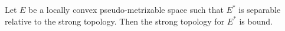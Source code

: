 Let $E$ be a locally convex pseudo-metrizable space such that $E^*$ is separable relative to the strong topology. Then the strong topology for $E^*$ is bound.
